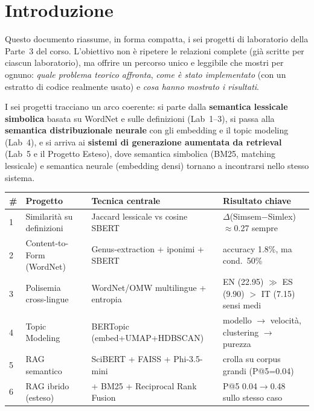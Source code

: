 \documentclass[11pt,a4paper]{article}
\begin{document}
\section{Introduzione}

Questo documento riassume, in forma compatta, i sei progetti di laboratorio della Parte~3 del corso. L'obiettivo non è ripetere le relazioni complete (già scritte per ciascun laboratorio), ma offrire un percorso unico e leggibile che mostri per ognuno: \emph{quale problema teorico affronta}, \emph{come è stato implementato} (con un estratto di codice realmente usato) e \emph{cosa hanno mostrato i risultati}.

I sei progetti tracciano un arco coerente: si parte dalla \textbf{semantica lessicale simbolica} basata su WordNet e sulle definizioni (Lab~1--3), si passa alla \textbf{semantica distribuzionale neurale} con gli embedding e il topic modeling (Lab~4), e si arriva ai \textbf{sistemi di generazione aumentata da retrieval} (Lab~5 e il Progetto Esteso), dove semantica simbolica (BM25, matching lessicale) e semantica neurale (embedding densi) tornano a incontrarsi nello stesso sistema.

\begin{center}
\small
\begin{tabularx}{\textwidth}{@{}l l X l@{}}
\toprule
\textbf{\#} & \textbf{Progetto} & \textbf{Tecnica centrale} & \textbf{Risultato chiave} \\
\midrule
1 & Similarità su definizioni & Jaccard lessicale vs cosine SBERT & $\Delta$(Simsem$-$Simlex)$\approx$0.27 sempre \\
2 & Content-to-Form (WordNet) & Genus-extraction + iponimi + SBERT & accuracy 1.8\%, ma cond.\ 50\% \\
3 & Polisemia cross-lingue & WordNet/OMW multilingue + entropia & EN (22.95) $\gg$ ES (9.90) $>$ IT (7.15) sensi medi \\
4 & Topic Modeling & BERTopic (embed+UMAP+HDBSCAN) & modello $\to$ velocità, clustering $\to$ purezza \\
5 & RAG semantico & SciBERT + FAISS + Phi-3.5-mini & crolla su corpus grandi (P@5=0.04) \\
6 & RAG ibrido (esteso) & + BM25 + Reciprocal Rank Fusion & P@5 0.04$\to$0.48 sullo stesso caso \\
\bottomrule
\end{tabularx}
\end{center}
\end{document}
